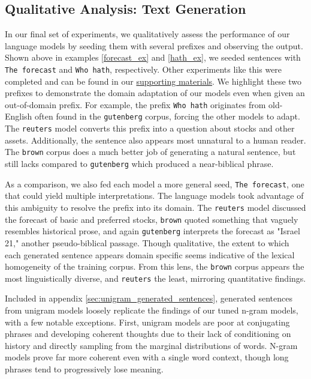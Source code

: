 \documentclass[11pt,a4paper]{article}
\begin{document}
\subsection{Qualitative Analysis: Text Generation}
\label{subsec:language_gen}

In our final set of experiments, we qualitatively assess the performance of our language models by seeding them with
several prefixes and observing the output. Shown above in examples \ref{forecast_ex} and \ref{hath_ex}, we seeded sentences with \texttt{The forecast} and \texttt{Who hath}, respectively. Other experiments like this were completed and can be found in our \href{https://github.com/SamShowalter/CS272-NLP/tree/master/hw2}{supporting materials}. We highlight these two prefixes to demonstrate the domain adaptation of our models even when given an out-of-domain prefix. For example, the prefix \texttt{Who hath} originates from old-English often found in the \texttt{gutenberg} corpus, forcing the other models to adapt. The \texttt{reuters} model converts this prefix into a question about stocks and other assets. Additionally, the sentence also appears most unnatural to a human reader. The \texttt{brown} corpus does a much better job of generating a natural sentence, but still lacks compared to \texttt{gutenberg} which produced a near-biblical phrase. 

As a comparison, we also fed each model a more general seed, \texttt{The forecast}, one that could yield multiple interpretations. The language models took advantage of this ambiguity to resolve the prefix into its domain. The \texttt{reuters} model discussed the forecast of basic and preferred stocks, \texttt{brown} quoted something that vaguely resembles historical prose, and again \texttt{gutenberg} interprets the forecast as "Israel 21," another pseudo-biblical passage. Though qualitative, the extent to which each generated sentence appears domain specific seems indicative of the lexical homogeneity of the training corpus. From this lens, the \texttt{brown} corpus appears the most linguistically diverse, and \texttt{reuters} the least, mirroring quantitative findings.

Included in appendix \ref{sec:unigram_generated_sentences}, generated sentences from unigram models loosely replicate the findings of our tuned n-gram models, with a few notable exceptions. First, unigram models are poor at conjugating phrases and developing coherent thoughts due to their lack of conditioning on history and directly sampling from the marginal distributions of words. N-gram models prove far more coherent even with a single word context, though long phrases tend to progressively lose meaning.
\end{document}
